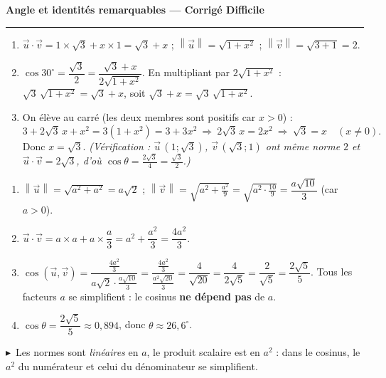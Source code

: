 \documentclass[11pt,a4paper]{article}
\providecommand{\norm}[1]{\left\lVert #1\right\rVert}
\newcommand{\cor}[1]{\medskip\noindent{\color{primarydark}\bfseries\large Corrigé #1.}\par\smallskip}
\newcommand{\rep}{\textcolor{excol}{$\blacktriangleright$}\ }
\begin{document}
\begin{center}
{\LARGE\bfseries\color{primarydark}Angle et identités remarquables — Corrigé Difficile}\\[2pt]
{\color{primary}\rule{0.55\linewidth}{1.1pt}}
\end{center}
\vspace{2mm}

\cor{1}
\begin{enumerate}[label=\textbf{\alph*)},leftmargin=2em,itemsep=3pt]
  \item $\vec u\cdot\vec v=1\times\sqrt3+x\times1=\sqrt3+x$ ; $\norm{\vec u}=\sqrt{1+x^2}$ ;
        $\norm{\vec v}=\sqrt{3+1}=2$.
  \item $\cos30^\circ=\dfrac{\sqrt3}{2}=\dfrac{\sqrt3+x}{2\sqrt{1+x^2}}$. En multipliant par
        $2\sqrt{1+x^2}$ : $\sqrt3\,\sqrt{1+x^2}=\sqrt3+x$, soit $\sqrt3+x=\sqrt3\,\sqrt{1+x^2}$.
  \item On élève au carré (les deux membres sont positifs car $x>0$) :
        \[
          3+2\sqrt3\,x+x^2=3(1+x^2)=3+3x^2
          \ \Longrightarrow\ 2\sqrt3\,x=2x^2
          \ \Longrightarrow\ \sqrt3=x \quad(x\neq0).
        \]
        Donc $\boxed{x=\sqrt3}$. \emph{(Vérification : $\vec u\,(1;\sqrt3)$, $\vec v\,(\sqrt3;1)$ ont
        même norme $2$ et $\vec u\cdot\vec v=2\sqrt3$, d'où $\cos\theta=\frac{2\sqrt3}{4}=\frac{\sqrt3}{2}$.)}
\end{enumerate}

\cor{2}
\begin{enumerate}[label=\textbf{\alph*)},leftmargin=2em,itemsep=3pt]
  \item $\norm{\vec u}=\sqrt{a^2+a^2}=a\sqrt2$ ; \quad
        $\norm{\vec v}=\sqrt{a^2+\tfrac{a^2}{9}}=\sqrt{a^2\cdot\tfrac{10}{9}}=\dfrac{a\sqrt{10}}{3}$
        (car $a>0$).
  \item $\vec u\cdot\vec v=a\times a+a\times\dfrac{a}{3}=a^2+\dfrac{a^2}{3}=\dfrac{4a^2}{3}$.
  \item $\cos(\vec u,\vec v)=\dfrac{\tfrac{4a^2}{3}}{a\sqrt2\cdot\tfrac{a\sqrt{10}}{3}}
        =\dfrac{\tfrac{4a^2}{3}}{\tfrac{a^2\sqrt{20}}{3}}=\dfrac{4}{\sqrt{20}}=\dfrac{4}{2\sqrt5}
        =\dfrac{2}{\sqrt5}=\dfrac{2\sqrt5}{5}$. Tous les facteurs $a$ se simplifient : le cosinus
        \textbf{ne dépend pas} de $a$.
  \item $\cos\theta=\dfrac{2\sqrt5}{5}\approx0{,}894$, donc $\theta\approx26{,}6^\circ$.
\end{enumerate}
\rep Les normes sont \emph{linéaires} en $a$, le produit scalaire est en $a^2$ : dans le cosinus, le
$a^2$ du numérateur et celui du dénominateur se simplifient.
\end{document}
